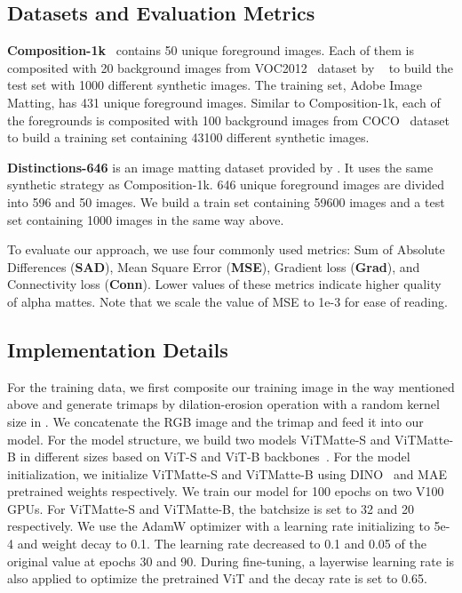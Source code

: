 \documentclass[10pt,twocolumn,letterpaper]{article}
\newcommand{\thename}{ViTMatte}
\begin{document}
\subsection{Datasets and Evaluation Metrics}

\textbf{Composition-1k}~\cite{DIM} contains 50 unique foreground images. Each of them is composited with 20 background images from VOC2012~\cite{voc} dataset by ~\cite{rmat} to build the test set with 1000 different synthetic images. The training set, Adobe Image Matting, has 431 unique foreground images. Similar to Composition-1k, each of the foregrounds is composited with 100 background images from COCO~\cite{mscoco} dataset to build a training set containing 43100 different synthetic images.

\textbf{Distinctions-646} is an image matting dataset provided by \cite{HAttMatting}. It uses the same synthetic strategy as Composition-1k. 646 unique foreground images are divided into 596 and 50 images. We build a train set containing 59600 images and a test set containing 1000 images in the same way above.

To evaluate our approach, we use four commonly used metrics: Sum of Absolute Differences (\textbf{SAD}), Mean Square Error (\textbf{MSE}), Gradient loss (\textbf{Grad}), and Connectivity loss (\textbf{Conn}). Lower values of these metrics indicate higher quality of alpha mattes. Note that we scale the value of MSE to 1e-3 for ease of reading.

\subsection{Implementation Details}
For the training data, we first composite our training image in the way mentioned above and generate trimaps by dilation-erosion operation with a random kernel size in . We concatenate the RGB image and the trimap and feed it into our model. For the model structure, we build two models \thename{}-S and \thename{}-B in different sizes based on ViT-S and ViT-B backbones~\cite{vit}.  For the model initialization, we initialize \thename-S and \thename-B using DINO~\cite{dino} and MAE~\cite{he2022masked} pretrained weights respectively. We train our model for 100 epochs on two V100 GPUs. For ViTMatte-S and ViTMatte-B, the batchsize is set to 32 and 20 respectively. We use the AdamW optimizer with a learning rate initializing to 5e-4 and weight decay to 0.1.  The learning rate decreased to 0.1 and 0.05 of the original value at epochs 30 and 90. During fine-tuning, a layerwise learning rate is also applied to optimize the pretrained ViT and the decay rate is set to 0.65.
\end{document}

